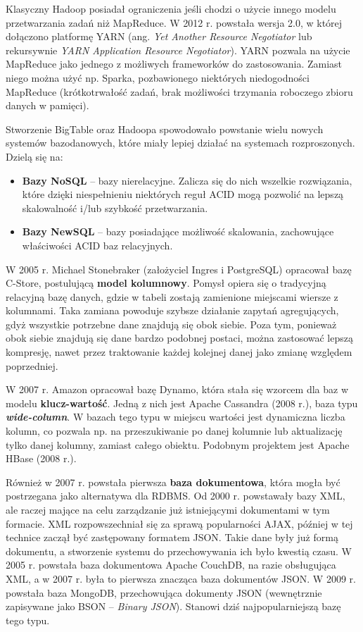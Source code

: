 \documentclass[12pt,a4paper,twoside,titlepage,openright]{book}
\begin{document}
Klasyczny Hadoop posiadał ograniczenia jeśli chodzi o użycie innego modelu przetwarzania zadań niż MapReduce. W 2012 r. powstała wersja 2.0, w której dołączono platformę YARN (ang. \textit{Yet Another Resource Negotiator} lub rekursywnie \textit{YARN Application Resource Negotiator}). YARN pozwala na użycie MapReduce jako jednego z możliwych frameworków do zastosowania. Zamiast niego można użyć np. Sparka, pozbawionego niektórych niedogodności MapReduce (krótkotrwałość zadań, brak możliwości trzymania roboczego zbioru danych w pamięci). \cite{hadoop, bigData}

Stworzenie BigTable oraz Hadoopa spowodowało powstanie wielu nowych systemów bazodanowych, które miały lepiej działać na systemach rozproszonych. Dzielą się na:
\begin{itemize}
\item \textbf{Bazy NoSQL} -- bazy nierelacyjne. Zalicza się do nich wszelkie rozwiązania, które dzięki niespełnieniu niektórych reguł ACID mogą pozwolić na lepszą skalowalność i/lub szybkość przetwarzania.
\item \textbf{Bazy NewSQL} -- bazy posiadające możliwość skalowania, zachowujące właściwości ACID baz relacyjnych.
\end{itemize}

W 2005 r. Michael Stonebraker (założyciel Ingres i PostgreSQL) opracował bazę C-Store, postulującą \textbf{model kolumnowy}. Pomysł opiera się o tradycyjną relacyjną bazę danych, gdzie w tabeli zostają zamienione miejscami wiersze z kolumnami. Taka zamiana powoduje szybsze działanie zapytań agregujących, gdyż wszystkie potrzebne dane znajdują się obok siebie. Poza tym, ponieważ obok siebie znajdują się dane bardzo podobnej postaci, można zastosować lepszą kompresję, nawet przez traktowanie każdej kolejnej danej jako zmianę względem poprzedniej.

W 2007 r. Amazon opracował bazę Dynamo, która stała się wzorcem dla baz w modelu \textbf{klucz-wartość}. Jedną z nich jest Apache Cassandra (2008 r.), baza typu \textit{\textbf{wide-column}}. W bazach tego typu w miejscu wartości jest dynamiczna liczba kolumn, co pozwala np. na przeszukiwanie po danej kolumnie lub aktualizację tylko danej kolumny, zamiast całego obiektu. Podobnym projektem jest Apache HBase (2008 r.).

Również w 2007 r. powstała pierwsza \textbf{baza dokumentowa}, która mogła być postrzegana jako alternatywa dla RDBMS. Od 2000 r. powstawały bazy XML, ale raczej mające na celu zarządzanie już istniejącymi dokumentami w tym formacie. XML rozpowszechniał się za sprawą popularności AJAX, później w tej technice zaczął być zastępowany formatem JSON. Takie dane były już formą dokumentu, a stworzenie systemu do przechowywania ich było kwestią czasu. W 2005 r. powstała baza dokumentowa Apache CouchDB, na razie obsługująca XML, a w 2007 r. była to pierwsza znacząca baza dokumentów JSON. W 2009 r. powstała baza MongoDB, przechowująca dokumenty JSON (wewnętrznie zapisywane jako BSON -- \textit{Binary JSON}). Stanowi dziś najpopularniejszą bazę tego typu.
\end{document}

